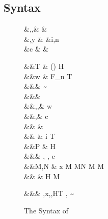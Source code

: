 \documentclass[screen,nonacm,manuscript,review]{acmart} %
\begin{document}
\subsection{Syntax}\label{sec:sfk-syntax}
\begin{figure}[ht]
 \centering
 \begin{syntax}
  &\TyVar,\beta,\Co &  & \\
  &\TmVar,y &\qquad{} &i,n \in {} \\
  &c & &
 \end{syntax}
 \begin{syntax}
  &&T \bnfeq& (\to) \bnfor \star \bnfor H\\
  &&w \bnfeq& \TyVar \bnfor F_n \bnfor T\\
  &&\Prop \bnfeq& \tau\sim\sigma\\
  &&\TyCo \bnfeq& \tau \bnfor \Co\\
  &&\tau,\sigma,\kappa \bnfeq& w \bnfor \tau\App\tau %
 \bnfor \Forall {\TyVar\co\kappa} \tau \bnfor %
 \tau \bnfor \Cast\tau\Co \bnfor \tau\App\Co\\
  &&\MCo,\Co \bnfeq& c \bnfor \Refl\tau \bnfor \Sym\Co \bnfor \Trans\MCo\Co \\ %
 && \bnfor&  \bnfor {} %
 \bnfor {} %
 \bnfor \Co\At\MCo \bnfor {}\\ %
 && \bnfor& \MCo\App\Co \bnfor \Left \Co \bnfor \Right \Co %
 \bnfor \Nth i \Co \bnfor \shl{\Kind \Co} \bnfor T\App\many\phi \\  %
  &&P \bnfeq& H\App \many\alpha\co\kappa \shl{\Telescope} \\
  &&\Telescope \bnfeq& \empt \bnfor \Telescope, \TyVar\co\kappa \bnfor \Telescope, c\co\Prop\\
  &&M,N \bnfeq& x \bnfor {} M \bnfor M\App N %
 \bnfor \TLam{\tau\co\kappa} M \bnfor M\App \tau \\
 && \bnfor&  {\Tm} \bnfor \Tm\App\Co %
 \bnfor H \bnfor \Case M  \bnfor \Cast \Tm \Co
 \end{syntax}
 \begin{syntax}
  &&\TEnv \bnfeq& \empt \bnfor \TEnv,x\co\tau \bnfor \TEnv,\TyVar\co\kappa \bnfor \TEnv,H\co T \bnfor \TEnv, \Co \co \tau\sim\sigma
 \end{syntax}
\caption{The Syntax of \SFK}\label{fig:sfk-syntax}
\end{figure}
\end{document}
